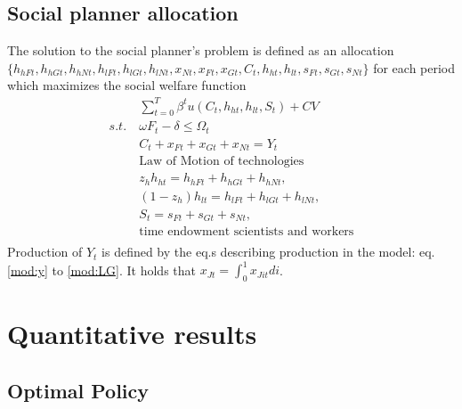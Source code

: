 %

\subsection{Social planner allocation}\label{app:sp_prob} The solution to the social planner's problem is defined as an allocation \\ $\{h_{hFt}, h_{hGt}, h_{hNt}, h_{lFt}, h_{lGt}, h_{lNt}, x_{Nt}, x_{Ft}, x_{Gt}, C_t,  h_{ht}, h_{lt}, s_{Ft}, s_{Gt}, s_{Nt} \}$ for each period which maximizes the social welfare function 
\begin{align*} &\sum_{t=0}^{T}\beta^t u(C_{t}, h_{ht}, h_{lt}, S_{t})+ CV\\
s.t.\ &  \omega F_{t} -\delta \leq \Omega_t\\
&C_t+x_{Ft}+x_{Gt}+x_{Nt}=Y_t\\
&\text{Law of Motion of technologies}\\
&z_h h_{ht}=h_{hFt}+h_{hGt}+h_{hNt},\\
&(1-z_h) h_{lt}=h_{lFt}+h_{lGt}+h_{lNt},\\
&S_{t}=s_{Ft}+s_{Gt}+s_{Nt},\\
&\text{time endowment scientists and workers}\\
\end{align*}
Production of $Y_t$ is defined by the eq.s describing production in the model: eq. \eqref{mod:y} to \ref{mod:LG}. It holds that $x_{Jt}=\int_{0}^{1}x_{Jit}di$.
\section{Quantitative results}\label{app:quant_res}



\subsection{Optimal Policy}\label{app:quant_res_opt}

